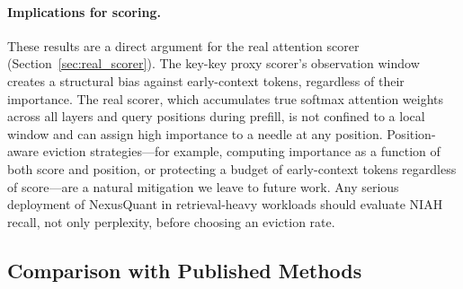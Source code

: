 \documentclass{article}
\begin{document}
\paragraph{Implications for scoring.}
These results are a direct argument for the real attention scorer
(Section~\ref{sec:real_scorer}).
The key-key proxy scorer's observation window creates a structural bias against
early-context tokens, regardless of their importance.
The real scorer, which accumulates true softmax attention weights across all
layers and query positions during prefill, is not confined to a local window
and can assign high importance to a needle at any position.
Position-aware eviction strategies---for example, computing importance as a
function of both score and position, or protecting a budget of early-context
tokens regardless of score---are a natural mitigation we leave to future work.
Any serious deployment of NexusQuant in retrieval-heavy workloads should
evaluate NIAH recall, not only perplexity, before choosing an eviction rate.

\subsection{Comparison with Published Methods}
\label{sec:sota}
\end{document}
